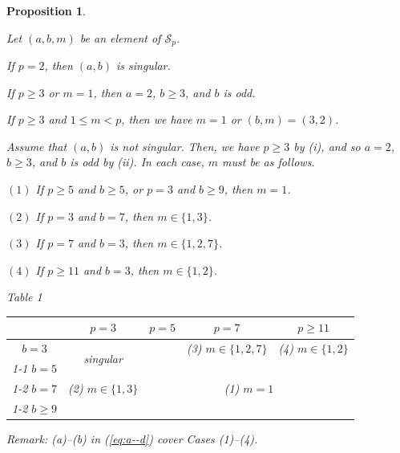 \documentclass{amsart}
\theoremstyle{plain}
\newtheorem{prop}[thm]{Proposition}
\theoremstyle{definition}
\newcommand{\nd}{\noindent}
\begin{document}
\begin{prop}\label{thm:admissible}

Let $(a,b,m)$ be an element of $\mathcal{S}_p$. 


\nd{\rm (i)} 
If $p=2$, 
then $(a,b)$ is singular. 



\nd{\rm (ii)} 
If $p\ge 3$ or $m=1$, 
then $a=2$, $b\ge 3$, and $b$ is odd. 



\nd{\rm (iii)} 
If $p\ge 3$ and $1\le m<p$, 
then we have $m=1$ or $(b,m)=(3,2)$. 



\nd{\rm (iv)} 
Assume that $(a,b)$ is not singular. 
Then, 
we have $p\ge 3$ by {\rm (i)}, 
and so $a=2$, $b\ge 3$, and $b$ is odd by {\rm (ii)}. 
In each case, 
$m$ must be as follows. 


$(1)$ 
If $p\ge 5$ and $b\ge 5$, or $p=3$ and $b\ge 9$, 
then $m=1$. 



$(2)$ 
If $p=3$ and $b=7$, 
then $m\in \{ 1,3\} $. 


$(3)$ 
If $p=7$ and $b=3$, 
then $m\in \{ 1,2,7\} $. 


$(4)$ 
If $p\ge 11$ and $b=3$, 
then $m\in \{ 1,2\} $. 


\begin{center}
{\rm Table 1\quad 
\begin{tabular}{|c|cc|c|c|}
\hline
 & $p=3$ & \multicolumn{1}{|c|}{$p=5$} & $p=7$ & $p\ge 11$ \\ \hline
$b=3$ & \multirow{2}{*}{singular}& &(3) $m\in \{ 1, 2, 7\} $ & 
(4) $m\in \{ 1, 2\} $ \\ \cline{1-1}\cline{3-5}
$b=5$ &  & \multicolumn{3}{|c|}{}\\ \cline{1-2}
$b=7$ &(2) $m\in \{ 1, 3\} $&  \multicolumn{3}{|c|}{(1) $m=1$}\\ \cline{1-2}
$b\ge 9$ & \multicolumn{4}{|c|}{}\\ \hline 
\end{tabular}

}


\end{center}

\nd 
{\rm Remark: (a)--(b) in (\ref{eq:a--d}) cover Cases (1)--(4).}

\end{prop}
\end{document}
